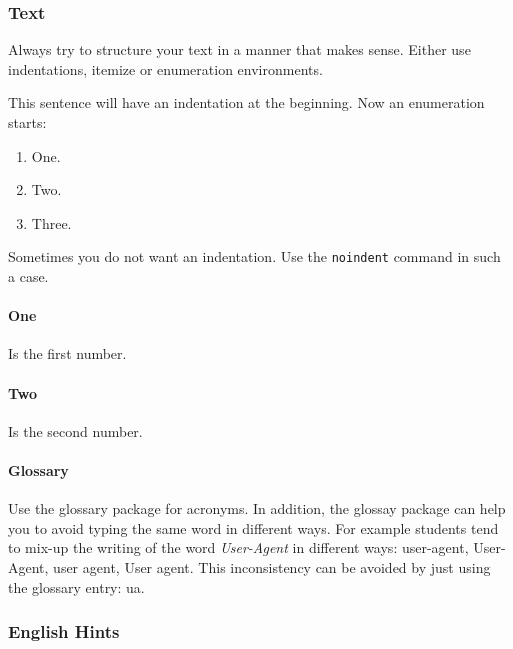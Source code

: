 \subsubsection{Text }
Always try to structure your text in a manner that makes sense. Either use indentations, itemize or enumeration environments.

This sentence will have an indentation at the beginning. Now an enumeration starts:

\begin{enumerate}
\item One.
\item Two.
\item Three.
\end{enumerate}

\noindent Sometimes you do not want an indentation. Use the \texttt{noindent} command in such a case.
\paragraph{One} Is the first number. 

\paragraph{Two} Is the second number.

\paragraph{Glossary}
Use the glossary package for acronyms.
In addition, the glossay package can help you to avoid typing the same word in different ways.
For example students tend to mix-up the writing of the word \emph{User-Agent} in different ways: user-agent, User-Agent, user agent, User agent.
This inconsistency can be avoided by just using the glossary entry: \gls{ua}.

\subsubsection{English Hints}

